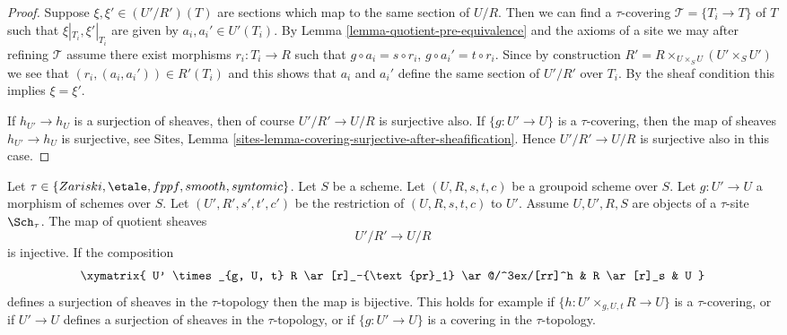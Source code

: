 \begin{proof}
Suppose $\xi, \xi' \in (U'/R')(T)$ are sections which
map to the same section of $U/R$.
Then we can find a $\tau$-covering $\mathcal{T} = \{T_i \to T\}$ of $T$
such that $\xi|_{T_i}, \xi'|_{T_i}$ are given by $a_i, a_i' \in U'(T_i)$. By
Lemma \ref{lemma-quotient-pre-equivalence}
and the axioms of a site we may after refining
$\mathcal{T}$ assume there exist morphisms $r_i : T_i \to R$
such that $g \circ a_i = s \circ r_i$, $g \circ a_i' = t \circ r_i$.
Since by construction
$R' = R \times_{U \times_S U} (U' \times_S U')$
we see that $(r_i, (a_i, a_i')) \in R'(T_i)$ and this
shows that $a_i$ and $a_i'$ define the same section
of $U'/R'$ over $T_i$. By the sheaf condition this implies
$\xi = \xi'$.

\medskip\noindent
If $h_{U'} \to h_U$ is a surjection
of sheaves, then of course $U'/R' \to U/R$ is surjective also.
If $\{g : U' \to U\}$ is a $\tau$-covering, then
the map of sheaves $h_{U'} \to h_U$ is surjective, see
Sites, Lemma \ref{sites-lemma-covering-surjective-after-sheafification}.
Hence $U'/R' \to U/R$ is surjective also in this case.
\end{proof}

\begin{lemma}
\label{lemma-quotient-groupoid-restrict}
Let $\tau \in \{Zariski, \etale, fppf, smooth, syntomic\}$.
Let $S$ be a scheme.
Let $(U, R, s, t, c)$ be a groupoid scheme over $S$.
Let $g : U' \to U$ a morphism of schemes over $S$.
Let $(U', R', s', t', c')$ be the restriction of $(U, R, s, t, c)$ to $U'$.
Assume  $U, U', R, S$ are objects of a $\tau$-site $\Sch_\tau$.
The map of quotient sheaves
$$
U'/R' \longrightarrow U/R
$$
is injective. If the composition
$$
\xymatrix{
U' \times_{g, U, t} R \ar[r]_-{\text{pr}_1} \ar@/^3ex/[rr]^h
& R \ar[r]_s & U
}
$$
defines a surjection of sheaves in the $\tau$-topology  then
the map is bijective. This holds for example if
$\{h : U' \times_{g, U, t} R \to U\}$ is a $\tau$-covering, or
if $U' \to U$ defines a surjection of sheaves in the $\tau$-topology, or if
$\{g : U' \to U\}$ is a covering in the $\tau$-topology.
\end{lemma}

